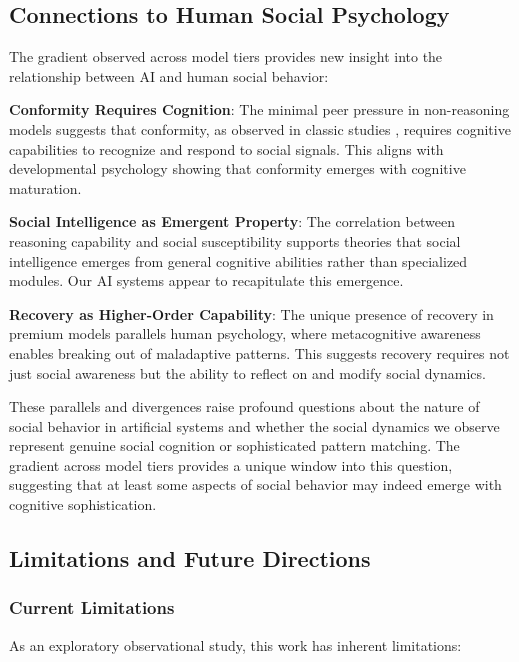 \documentclass[11pt,letterpaper]{article}
\begin{document}
\subsection{Connections to Human Social Psychology}

The gradient observed across model tiers provides new insight into the relationship between AI and human social behavior:

\textbf{Conformity Requires Cognition}: The minimal peer pressure in non-reasoning models suggests that conformity, as observed in classic studies \citep{asch1956studies}, requires cognitive capabilities to recognize and respond to social signals. This aligns with developmental psychology showing that conformity emerges with cognitive maturation.

\textbf{Social Intelligence as Emergent Property}: The correlation between reasoning capability and social susceptibility supports theories that social intelligence emerges from general cognitive abilities rather than specialized modules. Our AI systems appear to recapitulate this emergence.

\textbf{Recovery as Higher-Order Capability}: The unique presence of recovery in premium models parallels human psychology, where metacognitive awareness enables breaking out of maladaptive patterns. This suggests recovery requires not just social awareness but the ability to reflect on and modify social dynamics.

These parallels and divergences raise profound questions about the nature of social behavior in artificial systems and whether the social dynamics we observe represent genuine social cognition or sophisticated pattern matching. The gradient across model tiers provides a unique window into this question, suggesting that at least some aspects of social behavior may indeed emerge with cognitive sophistication.

\subsection{Limitations and Future Directions}

\subsubsection{Current Limitations}

As an exploratory observational study, this work has inherent limitations:
\end{document}
